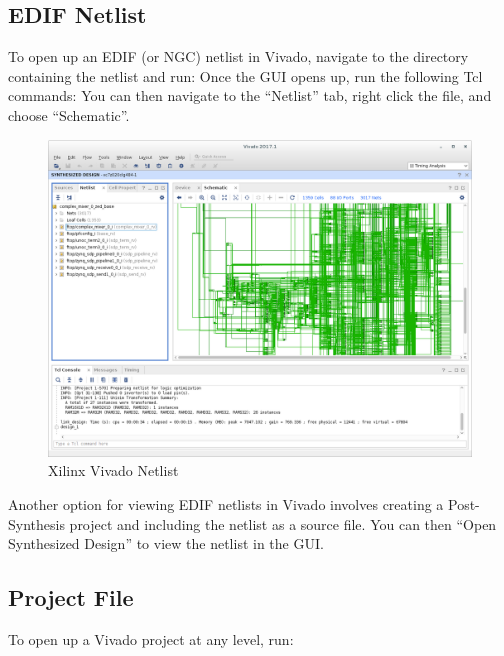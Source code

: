 \begin{flushleft}
\subsection{EDIF Netlist}
To open up an EDIF (or NGC) netlist in Vivado, navigate to the directory containing the netlist and run:
\newline
Once the GUI opens up, run the following Tcl commands:
You can then navigate to the ``Netlist'' tab, right click the file, and choose ``Schematic''.
\begin{figure}[H]
	\centerline{\includegraphics[scale=0.4]{figures/xilinx_vivado_netlist}}
	\caption{Xilinx Vivado Netlist}
\end{figure}

Another option for viewing EDIF netlists in Vivado involves creating a Post-Synthesis project and including the netlist as a source file. You can then ``Open Synthesized Design'' to view the netlist in the GUI.
\subsection{Project File}
To open up a Vivado project at any level, run:\newline
{}\newline


\end{flushleft}
